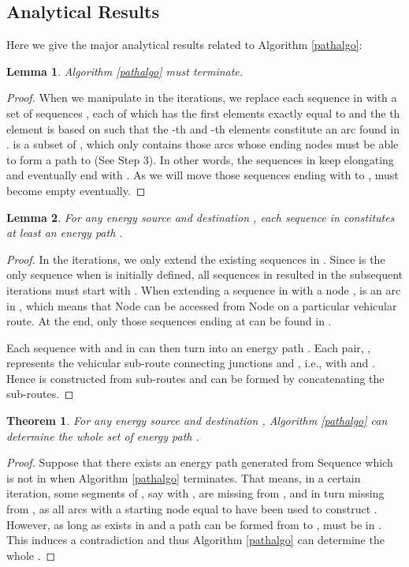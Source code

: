 \documentclass[journal]{IEEEtran}
\newtheorem{lemma}{\textbf{Lemma}}
\newtheorem{theorem}{\textbf{Theorem}}
\begin{document}
\subsection{Analytical Results} \label{sec:analysis}
Here we give the major analytical results related to Algorithm \ref{pathalgo}:
\begin{lemma} \label{lm:stop}
Algorithm \ref{pathalgo} must terminate.
\end{lemma}
\begin{proof}
When we manipulate  in the iterations, we replace each sequence  in  with a set of sequences , each of which has the first  elements exactly equal to  and the th element is based on  such that the -th and -th elements constitute an arc found in .  is a subset of , which only contains those arcs whose ending nodes must be able to form a path to  (See Step 3). In other words, the sequences in  keep elongating and eventually end with . As we will move those sequences ending with  to ,  must become empty eventually.
\end{proof}

\begin{lemma}
For any energy source  and destination , each sequence in  constitutes at least an energy path .
\end{lemma}
\begin{proof}
In the iterations, we only extend the existing sequences in . Since  is the only sequence when  is initially defined, all sequences in  resulted in the subsequent iterations must start with . When extending a sequence  in  with a node ,  is an arc in , which means that Node  can be accessed from Node  on a particular vehicular route. At the end, only those sequences ending at  can be found in .

Each sequence  with  and  in  can then turn into an energy path . Each  pair, , represents the vehicular sub-route connecting junctions  and , i.e.,  with  and . Hence  is constructed from  sub-routes and  can be formed by concatenating the  sub-routes.
\end{proof}

\begin{theorem} \label{thm:path}
For any energy source  and destination , Algorithm \ref{pathalgo} can determine the whole set of energy path . 
\end{theorem}
\begin{proof}
Suppose that there exists an energy path generated from Sequence  which is not in  when Algorithm \ref{pathalgo} terminates. That means, in a certain iteration, some segments of , say  with , are missing from , and in turn missing from , as all arcs with a starting node equal to  have been used to construct . However, as long as  exists in  and a path can be formed from  to ,  must be in . This induces a contradiction and thus Algorithm \ref{pathalgo} can determine the whole .
\end{proof}
\end{document}
